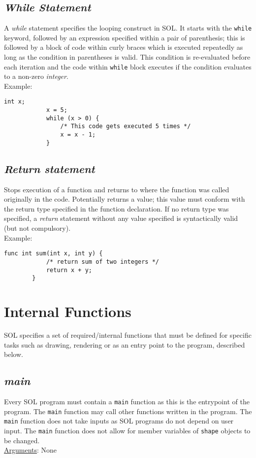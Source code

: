 \documentclass[letterpaper,12pt]{article}
\begin{document}
    \subsection{\textit{While Statement}}
    A \textit{while} statement specifies the looping construct in SOL. It starts with the \texttt{while} keyword, followed by an expression specified within a pair of parenthesis; this is followed by a block of code within curly braces which is executed repeatedly as long as the condition in parentheses is valid. This condition is re-evaluated before each iteration and the code within \texttt{while} block executes if the condition evaluates to a non-zero \textit{integer}. \\
    Example:\\
    \begin{lstlisting}[style=sol]
            int x;
            x = 5;
            while (x > 0) {
                /* This code gets executed 5 times */
                x = x - 1;
            }
        \end{lstlisting}

    \subsection{\textit{Return statement}}
    Stops execution of a function and returns to where the function was called originally in the code. Potentially returns a value; this value must conform with the return type specified in the function declaration. If no return type was specified, a \textit{return} statement without any value specified is syntactically valid (but not compulsory).\\
    Example:\\
    \begin{lstlisting}[style=sol]
        func int sum(int x, int y) {
            /* return sum of two integers */
            return x + y;
        }
    \end{lstlisting}
    
\section{Internal Functions} \label{internal}
SOL specifies a set of required/internal functions that must be defined for specific tasks such as drawing, rendering or as an entry point to the program, described below.

    \subsection{\textit{main}}
    Every SOL program must contain a \texttt{main} function as this is the entrypoint of the program. The \texttt{main} function may call other functions written in the program. The \texttt{main} function does not take inputs as SOL programs do not depend on user input. The \texttt{main} function does not allow for member variables of \texttt{shape} objects to be changed.\\
    \underline{Arguments}: None
\end{document}
